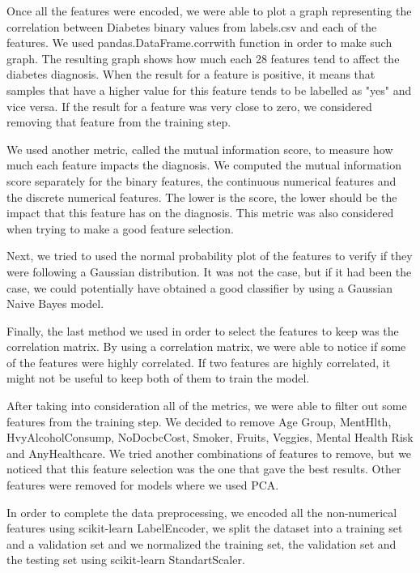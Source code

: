 \documentclass{article} %
\begin{document}
Once all the features were encoded, we were able to plot a graph representing the correlation between Diabetes binary 
values from labels.csv and each of the features. We used pandas.DataFrame.corrwith function in order to make such graph. 
The resulting graph shows how much each 28 features tend to affect the diabetes diagnosis. When the result for a feature is positive, 
it means that samples that have a higher value for this feature tends to be labelled as "yes" and vice versa. If the result for a 
feature was very close to zero, we considered removing that feature from the training step. 

We used another metric, called the mutual information score, to measure how much each feature impacts the diagnosis. We computed the mutual 
information score separately for the binary features, the continuous numerical features and the discrete numerical features. 
The lower is the score, the lower should be the impact that this feature has on the diagnosis. This metric was also considered when 
trying to make a good feature selection.

Next, we tried to used the normal probability plot of the features to verify if they were following a Gaussian distribution. It was not 
the case, but if it had been the case, we could potentially have obtained a good classifier by using a Gaussian Naive Bayes model.

Finally, the last method we used in order to select the features to keep was the correlation matrix. By using a correlation matrix, we 
were able to notice if some of the features were highly correlated. If two features are highly correlated, it might not be useful to 
keep both of them to train the model. 

After taking into consideration all of the metrics, we were able to filter out some features from the training step. We decided to 
remove Age Group, MentHlth, HvyAlcoholConsump, NoDocbcCost, Smoker, Fruits, Veggies, Mental Health Risk and AnyHealthcare. 
We tried another combinations of features to remove, but we noticed that this feature selection was the one that gave the best results.
Other features were removed for models where we used PCA. 

In order to complete the data preprocessing, we encoded all the non-numerical features using scikit-learn LabelEncoder, we split the 
dataset into a training set and a validation set and we normalized the training set, the validation set and the testing set using 
scikit-learn StandartScaler. 
\end{document}

